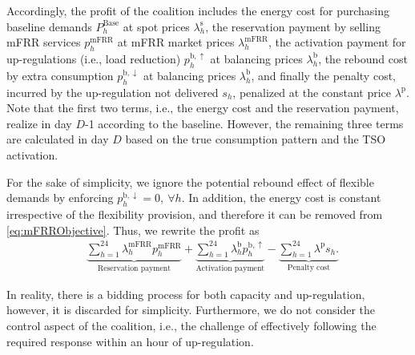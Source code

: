\documentclass[conference]{IEEEtran}
\begin{document}
Accordingly, the profit of the coalition includes the energy cost for purchasing baseline demands $P^{\text{Base}}_{h}$ at spot prices $\lambda^{\text{s}}_{h}$, the reservation payment by selling mFRR services $p^{\text{mFRR}}_{h}$ at mFRR market prices $\lambda_{h}^{\text{mFRR}}$, the activation payment for up-regulations (i.e., load reduction) $p^{\text{b},\uparrow}_{h}$ at balancing prices $\lambda_{h}^{\text{b}}$, the rebound cost by extra consumption $p^{\text{b},\downarrow}_{h}$ at balancing prices $\lambda_{h}^{\text{b}}$, and finally the penalty cost, incurred by the up-regulation not delivered $s_{h}$, penalized at the constant price $\lambda^{\text{p}}$. Note that the first two terms, i.e., the energy cost and the reservation payment, realize in day $D$-1 according to the baseline. However, the remaining three terms are calculated in day $D$ based on the true consumption pattern and the TSO activation.



For the sake of simplicity, we ignore the potential rebound effect of flexible demands by enforcing $p_{h}^{\text{b}, \downarrow} = 0, \ \forall{h}$. In addition, the energy cost is constant irrespective of the flexibility provision, and therefore it can be removed from \eqref{eq:mFRRObjective}. Thus, we rewrite the profit as
%
\begin{align}\label{eq:mFRR_profit}
     & \underbrace{\sum_{h=1}^{24}\lambda_{h}^{\text{mFRR}} p^{\text{mFRR}}_{h}}_{\textrm{Reservation payment}} + \underbrace{\sum_{h=1}^{24}  \lambda_{h}^{\text{b}} p^{\text{b},\uparrow}_{h}}_{\textrm{Activation payment}} - \underbrace{ \sum_{h=1}^{24}  \lambda^{\text{p}}s_{h}.}_{\textrm{Penalty cost}}
\end{align}


In reality, there is a bidding process for both capacity and up-regulation, however, it is discarded for simplicity. Furthermore, we do not consider the control aspect of the coalition, i.e., the challenge of effectively following the required response within an hour of up-regulation.
\end{document}
